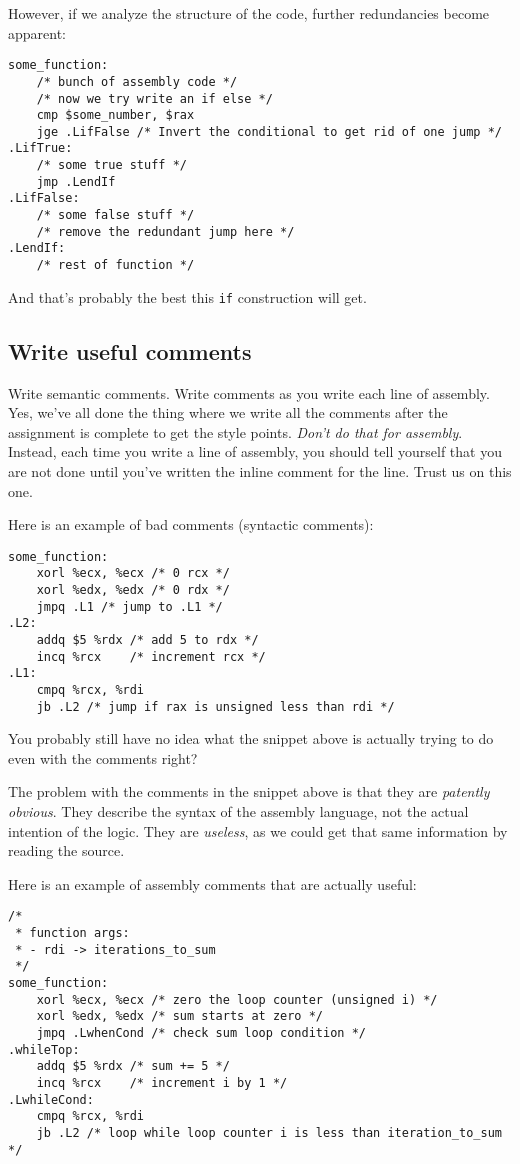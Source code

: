 \documentclass[11pt]{article}
\begin{document}
However, if we analyze the structure of the code, further redundancies become apparent:

\begin{lstlisting}
some_function:
    /* bunch of assembly code */
    /* now we try write an if else */
    cmp $some_number, $rax
    jge .LifFalse /* Invert the conditional to get rid of one jump */
.LifTrue:
    /* some true stuff */
    jmp .LendIf
.LifFalse:
    /* some false stuff */
    /* remove the redundant jump here */
.LendIf:
    /* rest of function */
\end{lstlisting}

And that's probably the best this \texttt{if} construction will get.

\subsection{Write useful comments}

Write semantic comments. Write comments as you write each line of assembly. Yes, we've all
done the thing where we write all the comments after the assignment is complete to get the
style points. \emph{Don't do that for assembly}. Instead, each time you write a line of assembly,
you should tell yourself that you are not done until you've written the inline comment for
the line. Trust us on this one.

Here is an example of bad comments (syntactic comments):

\begin{lstlisting}
some_function:
    xorl %ecx, %ecx /* 0 rcx */
    xorl %edx, %edx /* 0 rdx */
    jmpq .L1 /* jump to .L1 */
.L2:
    addq $5 %rdx /* add 5 to rdx */
    incq %rcx    /* increment rcx */
.L1:
    cmpq %rcx, %rdi
    jb .L2 /* jump if rax is unsigned less than rdi */
\end{lstlisting}

You probably still have no idea what the snippet above is actually trying to do even with
the comments right?

The problem with the comments in the snippet above is that they are \emph{patently
obvious}. They describe the syntax of the assembly language, not the actual intention of
the logic. They are \emph{useless}, as we could get that same  information by reading the
source.

Here is an example of assembly comments that are actually useful:

\begin{lstlisting}
/*
 * function args:
 * - rdi -> iterations_to_sum
 */
some_function:
    xorl %ecx, %ecx /* zero the loop counter (unsigned i) */
    xorl %edx, %edx /* sum starts at zero */
    jmpq .LwhenCond /* check sum loop condition */
.whileTop:
    addq $5 %rdx /* sum += 5 */
    incq %rcx    /* increment i by 1 */
.LwhileCond:
    cmpq %rcx, %rdi
    jb .L2 /* loop while loop counter i is less than iteration_to_sum */
\end{lstlisting}
\end{document}
